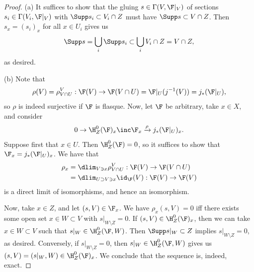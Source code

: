 \documentclass[12pt]{amsart}
\begin{document}
\begin{proof}
  (a) It suffices to show that the gluing $s\in \Gamma(V,\F|_V)$ of sections $s_i\in \Gamma(V_i, \F|_V)$ with $\Supp s_i\subset V_i\cap Z$ must have $\Supp s\subset V\cap Z$.
  Then $s_x=(s_i)_x$ for all $x\in U_i$ gives us 
  \[
    \Supp s = \bigcup_i \Supp s_i\subset \bigcup_i V_i\cap Z=V\cap Z,
  \]
  as desired.

  (b) Note that
  \[
    \rho(V)= \rho^V_{V\cap U}:\F(V)\to\F(V\cap U) = \F|_U(j^{-1}(V)) = j_*(\F|_U),
  \]
  so $\rho$ is indeed surjective if $\F$ is flasque.
  Now, let $\F$ be arbitrary, take $x\in X$, and consider
  \[
    0\to \H_Z^0(\F)_x\inc \F_x\xrightarrow{\rho} j_*(\F|_U)_x.
  \] 
  Suppose first that $x\in U$.
  Then $\H_Z^0(\F)=0$, so it suffices to show that $\F_x=j_*(\F|_U)_x$.
  We have that
  \begin{align*}
    \rho_x 
      &=\dlim_{V\ni x}\rho_{V\cap U}^V:\F(V)\to \F(V\cap U) \\
      &= \dlim_{U\supset V\ni x}\id_\F(V):\F(V)\to \F(V) \\
  \end{align*}
  is a direct limit of isomorphisms, and hence an isomorphism.

  Now, take $x\in Z$, and let $(s,V)\in\F_x$.
  We have $\rho_x(s,V)=0$ iff there exists some open set $x\in W\subset V$ with $s|_{W\setminus Z}=0$.
  If $(s,V)\in \H^0_Z(\F)_x$, then we can take $x\in W\subset V$ such that $s|_W\in \H^0_Z(\F,W)$.
  Then $\Supp s|_W\subset Z$ implies $s|_{W\setminus Z}=0$, as desired.
  Conversely, if $s|_{W\setminus Z}=0$, then $s|_W\in \H^0_Z(\F,W)$ gives us $(s,V)=(s|_W,W)\in \H^0_Z(\F)_x$.
  We conclude that the sequence is, indeed, exact.
\end{proof}

% 
\end{document}
